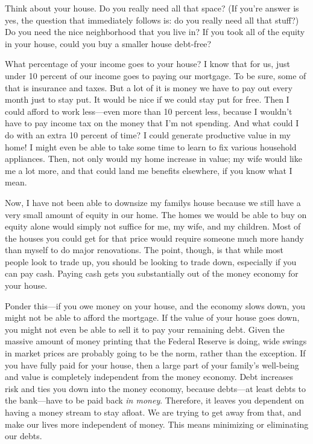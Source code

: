 \documentclass[letterpaper]{article}
\begin{document}
{\color{black}
Think about your house. Do you really need all that space?
\textcolor[rgb]{0.32941177,0.5529412,0.83137256}{(If you’re answer is
yes, the question that immediately follows is: do you really need all
that stuff?) }Do you need the nice neighborhood that you live in?  If
you took all of the equity in your house, could you buy a smaller house
debt-free?}

{\color{black}
What percentage of your income goes to your house?  I know that for us,
just under 10 percent of our income goes to paying our mortgage. To be
sure, some of that is insurance and taxes. But a lot of it is money we
have to pay out every month just to stay put. It would be nice if we
could stay put for free. Then I could afford to work less—even more
than 10 percent less, because I wouldn’t have to pay income tax on the
money that I’m not spending. And what could I do with an extra 10
percent of time? I could generate productive value in my home! I might
even be able to take some time to learn to fix various household
appliances. Then, not only would my home increase in value; my wife
would like me a lot more, and that could land me benefits elsewhere, if
you know what I mean.}

{\color{black}
Now, I have not been able to downsize my family{\textquotesingle}s house
because we still have a very small amount of equity in our home. The
homes we would be able to buy on equity alone would simply not suffice
for me, my wife, and my children. Most of the houses you could get for
that price would require someone much more handy than myself to do
major renovations. The point, though, is that while most people look to
trade up, you should be looking to trade down, especially if you can
pay cash. Paying cash gets you substantially out of the money economy
for your house.}

{\color{black}
Ponder this—if you owe money on your house, and the economy slows down,
you might not be able to afford the mortgage. If the value of your
house goes down, you might not even be able to sell it to pay your
remaining debt. Given the massive amount of money printing that the
Federal Reserve is doing, wide swings in market prices are probably
going to be the norm, rather than the exception. If you have fully paid
for your house, then a large part of your family’s well-being and value
is completely independent from the money economy. Debt increases risk
and ties you down into the money economy, because debts—at least debts
to the bank—have to be paid back \textit{in money}.  Therefore, it
leaves you dependent on having a money stream to stay afloat.  We are
trying to get away from that, and make our lives more independent of
money.  This means minimizing or eliminating our debts.}
\end{document}
